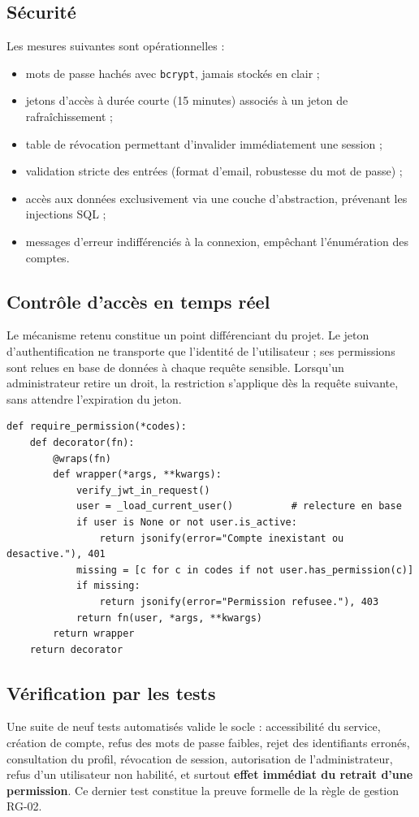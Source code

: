 \documentclass[11pt,a4paper]{article}
\begin{document}
\subsection{Sécurité}
Les mesures suivantes sont opérationnelles :
\begin{itemize}[leftmargin=1.5em, nosep]
  \item mots de passe hachés avec \texttt{bcrypt}, jamais stockés en clair ;
  \item jetons d'accès à durée courte (15 minutes) associés à un jeton de rafraîchissement ;
  \item table de révocation permettant d'invalider immédiatement une session ;
  \item validation stricte des entrées (format d'email, robustesse du mot de passe) ;
  \item accès aux données exclusivement via une couche d'abstraction, prévenant les injections SQL ;
  \item messages d'erreur indifférenciés à la connexion, empêchant l'énumération des comptes.
\end{itemize}

\subsection{Contrôle d'accès en temps réel}
Le mécanisme retenu constitue un point différenciant du projet. Le jeton d'authentification ne transporte que l'identité de l'utilisateur ; ses permissions sont relues en base de données à chaque requête sensible. Lorsqu'un administrateur retire un droit, la restriction s'applique dès la requête suivante, sans attendre l'expiration du jeton.

\begin{lstlisting}[caption={Décorateur de contrôle des permissions.}]
def require_permission(*codes):
    def decorator(fn):
        @wraps(fn)
        def wrapper(*args, **kwargs):
            verify_jwt_in_request()
            user = _load_current_user()          # relecture en base
            if user is None or not user.is_active:
                return jsonify(error="Compte inexistant ou desactive."), 401
            missing = [c for c in codes if not user.has_permission(c)]
            if missing:
                return jsonify(error="Permission refusee."), 403
            return fn(user, *args, **kwargs)
        return wrapper
    return decorator
\end{lstlisting}

\subsection{Vérification par les tests}
Une suite de neuf tests automatisés valide le socle : accessibilité du service, création de compte, refus des mots de passe faibles, rejet des identifiants erronés, consultation du profil, révocation de session, autorisation de l'administrateur, refus d'un utilisateur non habilité, et surtout \textbf{effet immédiat du retrait d'une permission}. Ce dernier test constitue la preuve formelle de la règle de gestion RG-02.
\end{document}
